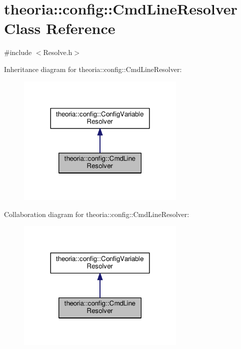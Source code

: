 \hypertarget{classtheoria_1_1config_1_1CmdLineResolver}{}\section{theoria\+:\+:config\+:\+:Cmd\+Line\+Resolver Class Reference}
\label{classtheoria_1_1config_1_1CmdLineResolver}


{\ttfamily \#include $<$Resolve.\+h$>$}



Inheritance diagram for theoria\+:\+:config\+:\+:Cmd\+Line\+Resolver\+:\nopagebreak
\begin{figure}[H]
\begin{center}
\leavevmode
\includegraphics[width=228pt]{classtheoria_1_1config_1_1CmdLineResolver__inherit__graph}
\end{center}
\end{figure}


Collaboration diagram for theoria\+:\+:config\+:\+:Cmd\+Line\+Resolver\+:\nopagebreak
\begin{figure}[H]
\begin{center}
\leavevmode
\includegraphics[width=228pt]{classtheoria_1_1config_1_1CmdLineResolver__coll__graph}
\end{center}
\end{figure}
